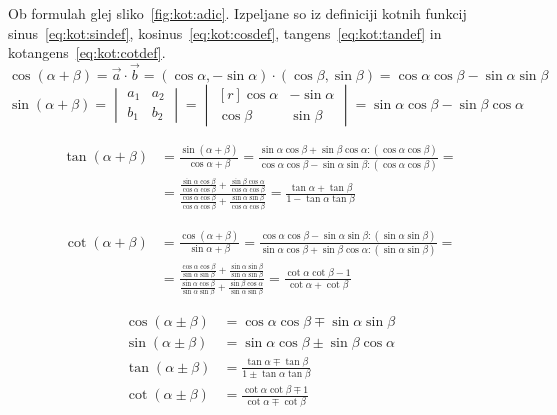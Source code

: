 \documentclass[a4paper,oneside,12pt,fleqn]{article}
\newcommand\krat\cdot
\newcommand\kos\cos
\numberwithin{equation}{section}
\begin{document}
Ob formulah glej sliko~\ref{fig:kot:adic}. Izpeljane so iz definiciji kotnih funkcij
sinus~\eqref{eq:kot:sindef}, kosinus~\eqref{eq:kot:cosdef}, tangens~\eqref{eq:kot:tandef} in
kotangens~\eqref{eq:kot:cotdef}.
\[\kos(\alpha+\beta) = \vec{a}\krat\vec{b} = (\kos\alpha, -\sin\alpha)\krat(\kos\beta,
\sin\beta) = \kos\alpha\kos\beta - \sin\alpha\sin\beta \]
\[\sin(\alpha+\beta) = \begin{vmatrix} a_1 & a_2 \\ b_1 & b_2 \end{vmatrix} = 
  \begin{vmatrix*}[r] \kos\alpha & -\sin\alpha \\ \kos\beta & \sin\beta \end{vmatrix*} =
  \sin\alpha\kos\beta - \sin\beta\kos\alpha \]

\begin{align*} \tan(\alpha+\beta) &= \frac{\sin(\alpha+\beta)}{\kos\alpha+\beta} =
\frac{\sin\alpha\kos\beta+\sin\beta\kos\alpha :(\kos\alpha\kos\beta)}{\kos\alpha\kos\beta
- \sin\alpha\sin\beta :(\kos\alpha\kos\beta)} =\\&=
\frac{\frac{\sin\alpha\kos\beta}{\kos\alpha\kos\beta}+\frac{\sin\beta\kos\alpha}{\kos\alpha\kos\beta}}
{\frac{\kos\alpha\kos\beta}{\kos\alpha\kos\beta}+\frac{\sin\alpha\sin\beta}{\kos\alpha\kos\beta}}
= \frac{\tan\alpha+\tan\beta}{1-\tan\alpha\tan\beta} \end{align*}

\begin{align*} \cot(\alpha+\beta) &= \frac{\kos(\alpha+\beta)}{\sin\alpha+\beta} =
\frac{\kos\alpha\kos\beta-\sin\alpha\sin\beta :(\sin\alpha\sin\beta)}{\sin\alpha\kos\beta
+ \sin\beta\kos\alpha :(\sin\alpha\sin\beta)} =\\&=
\frac{\frac{\kos\alpha\kos\beta}{\sin\alpha\sin\beta}+\frac{\sin\alpha\sin\beta}{\sin\alpha\sin\beta}}
{\frac{\sin\alpha\kos\beta}{\sin\alpha\sin\beta}+\frac{\sin\beta\kos\alpha}{\sin\alpha\sin\beta}}
= \frac{\cot\alpha\cot\beta-1}{\cot\alpha+\cot\beta} \end{align*}

\boldmath
\begin{align}
  \kos(\alpha\pm\beta) &= \kos\alpha\kos\beta \mp \sin\alpha\sin\beta \label{eq:kot:adic:cos} \\
  \sin(\alpha\pm\beta) &= \sin\alpha\kos\beta \pm \sin\beta\kos\alpha \label{eq:kot:adic:sin} \\
  \tan(\alpha\pm\beta) &= \frac{\tan\alpha \mp \tan\beta}{1 \pm \tan\alpha\tan\beta} \label{eq:kot:adic:tan} \\
  \cot(\alpha\pm\beta) &= \frac{\cot\alpha\cot\beta \mp 1}{\cot\alpha \mp \cot\beta} \label{eq:kot:adic:cot}
\end{align}
\unboldmath
\end{document}

